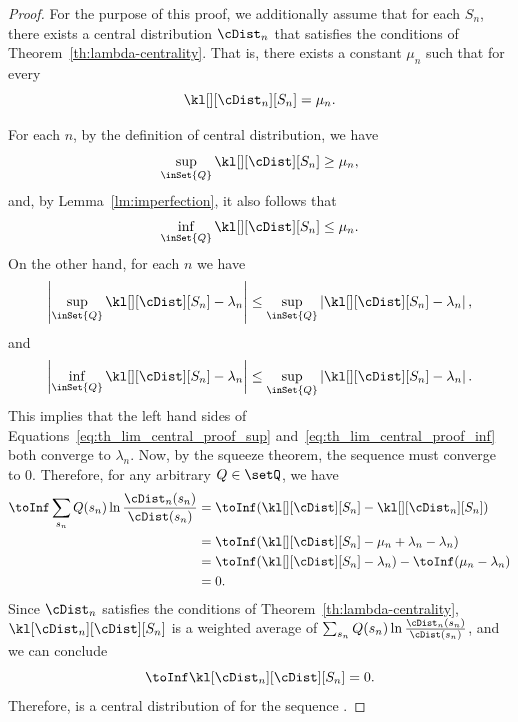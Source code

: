 \begin{proof}
    For the purpose of this proof, we additionally assume that for each \(S_n\), there exists
    a central distribution $\cDist_n$ that satisfies the conditions of Theorem~\ref{th:lambda-centrality}.
    That is, there exists a constant \(\mu_n\) such that for every 
    \[
        \kl[][\cDist_n][S_n] = \mu_n .
    \]

    For each \(n\), by the definition of central distribution, we have
    \begin{equation}
        \sup_{\inSet{Q}} \kl[][\cDist][S_n] \geq \mu_n,
        \label{eq:th_lim_central_proof_sup}
    \end{equation}
    and, by Lemma~\ref{lm:imperfection}, it also follows that
    \begin{equation}
        \inf_{\inSet{Q}} \kl[][\cDist][S_n] \leq \mu_n .
        \label{eq:th_lim_central_proof_inf}
    \end{equation}
    On the other hand, for each $n$ we have
    \[
        \left| \sup_{\inSet{Q}} \kl[][\cDist][S_n] - \lambda_n \right|
        \leq \sup_{\inSet{Q}}  \left|\kl[][\cDist][S_n] - \lambda_n \right|,
    \]
    and
    \[
        \left|\inf_{\inSet{Q}} \kl[][\cDist][S_n] - \lambda_n \right|
        \leq \sup_{\inSet{Q}}  \left|\kl[][\cDist][S_n] - \lambda_n \right|.
    \]
    This implies that the left hand sides of
    Equations~\ref{eq:th_lim_central_proof_sup} and~\ref{eq:th_lim_central_proof_inf}  both converge to $\lambda_n$.
    Now, by the squeeze theorem, the sequence  must converge to $0$.
    Therefore, for any arbitrary \(Q \in \setQ\), we have
    \begin{align*}
        \toInf \sum_{s_n} Q(s_n) \ln \frac{\cDist_n(s_n)}{\cDist(s_n)} &=
        \toInf (\kl[][\cDist][S_n] - \kl[][\cDist_n][S_n]) \\
        &= \toInf (\kl[][\cDist][S_n] -\mu_n + \lambda_n - \lambda_n) \\
        &= \toInf(\kl[][\cDist][S_n] - \lambda_n) - \toInf(\mu_n - \lambda_n) \\
        &= 0 .
    \end{align*}
    Since $\cDist_n$ satisfies the conditions of Theorem~\ref{th:lambda-centrality},
    $\kl[\cDist_n][\cDist][S_n]$ is a weighted average of
    $\sum_{s_n} Q(s_n) \ln \frac{\cDist_n(s_n)}{\cDist(s_n)} $, and we can conclude
    \[
        \toInf \kl[\cDist_n][\cDist][S_n] = 0 .
    \]
    Therefore, \cDist is a central distribution of \setQ for the sequence .
\end{proof}


